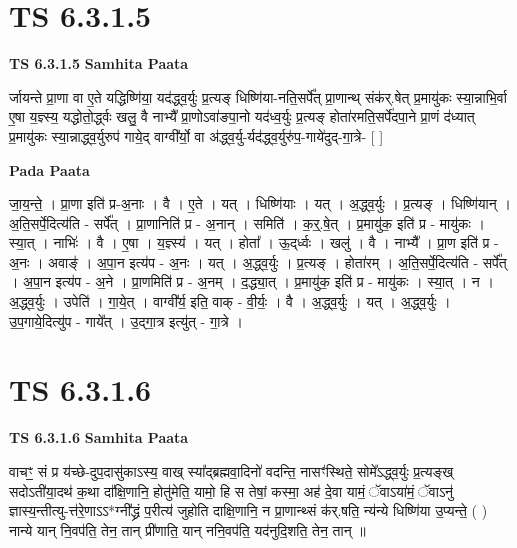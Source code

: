 \documentclass[17pt]{extarticle}
\begin{document}

\section{ TS 6.3.1.5 }

\textbf{TS 6.3.1.5 } \newline
\textbf{Samhita Paata} \newline

र्जायन्ते प्रा॒णा वा ए॒ते यद्धिष्णि॑या॒ यद॑द्ध्व॒र्युः प्र॒त्यङ् धिष्णि॑या-नति॒सर्पे᳚त् प्रा॒णान्थ् संक॑र्.षेत् प्र॒मायु॑कः स्या॒न्नाभि॒र्वा ए॒षा य॒ज्ञ्स्य॒ यद्धोतो॒र्द्ध्वः खलु॒ वै नाभ्यै᳚ प्रा॒णोऽवा॑ङपा॒नो यद॑ध्व॒र्युः प्र॒त्यङ् होता॑रमति॒सर्पे॑दपा॒ने प्रा॒णं द॑ध्यात् प्र॒मायु॑कः स्या॒न्नाद्ध्व॒र्युरुप॑ गाये॒द् वाग्वी᳚र्यो॒ वा अ॑द्ध्व॒र्यु-र्यद॑द्ध्व॒र्युरु॑प॒-गाये॑दुद्-गा॒त्रे- [  ] \newline

\textbf{Pada Paata} \newline

जा॒य॒न्ते॒ । प्रा॒णा इति॑ प्र-अ॒नाः । वै । ए॒ते । यत् । धिष्णि॑याः । यत् । अ॒द्ध्व॒र्युः । प्र॒त्यङ् । धिष्णि॑यान् । अ॒ति॒सर्पे॒दित्य॑ति - सर्पे᳚त् । प्रा॒णानिति॑ प्र - अ॒नान् । समिति॑ । क॒र्॒.षे॒त् । प्र॒मायु॑क॒ इति॑ प्र - मायु॑कः । स्या॒त् । नाभिः॑ । वै । ए॒षा । य॒ज्ञ्स्य॑ । यत् । होता᳚ । ऊ॒द्‌र्ध्वः । खलु॑ । वै । नाभ्यै᳚ । प्रा॒ण इति॑ प्र - अ॒नः । अवाङ्॑ । अ॒पा॒न इत्य॑प - अ॒नः । यत् । अ॒द्ध्व॒र्युः । प्र॒त्यङ् । होता॑रम् । अ॒ति॒सर्पे॒दित्य॑ति - सर्पे᳚त् । अ॒पा॒न इत्य॑प - अ॒ने । प्रा॒णमिति॑ प्र - अ॒नम् । द॒द्ध्या॒त् । प्र॒मायु॑क॒ इति॑ प्र - मायु॑कः । स्या॒त् । न । अ॒द्ध्व॒र्युः । उपेति॑ । गा॒ये॒त् । वाग्वी᳚र्य॒ इति॒ वाक् - वी॒र्यः॒ । वै । अ॒द्ध्व॒र्युः । यत् । अ॒द्ध्व॒र्युः । उ॒प॒गाये॒दित्यु॑प - गाये᳚त् । उ॒द्गा॒त्र इत्यु॑त् - गा॒त्रे ।  \newline





\section{ TS 6.3.1.6 }

\textbf{TS 6.3.1.6 } \newline
\textbf{Samhita Paata} \newline

वाचꣳ॒॒ सं प्र य॑च्छे-दुप॒दासु॑काऽस्य॒ वाख् स्या᳚द्ब्रह्मवा॒दिनो॑ वदन्ति॒ नासꣳ॑स्थिते॒ सोमे᳚ऽद्ध्व॒र्युः प्र॒त्यङ्ख् सदोऽती॑या॒दथ॑ क॒था दा᳚क्षि॒णानि॒ होतु॑मेति॒ यामो॒ हि स तेषां॒ कस्मा॒ अह॑ दे॒वा यामं॒ ॅवाऽया॑मं॒ ॅवाऽनु॑ ज्ञास्य॒न्तीत्यु-त्त॑रे॒णाऽऽ*ग्नी᳚द्ध्रं प॒रीत्य॑ जुहोति दाक्षि॒णानि॒ न प्रा॒णान्थ्सं क॑र्.षति॒ न्य॑न्ये धिष्णि॑या उ॒प्यन्ते॒ ( ) नान्ये यान् नि॒वप॑ति॒ तेन॒ तान् प्री॑णाति॒ यान् ननि॒वप॑ति॒ यद॑नुदि॒शति॒ तेन॒ तान् ॥ \newline
\end{document}
